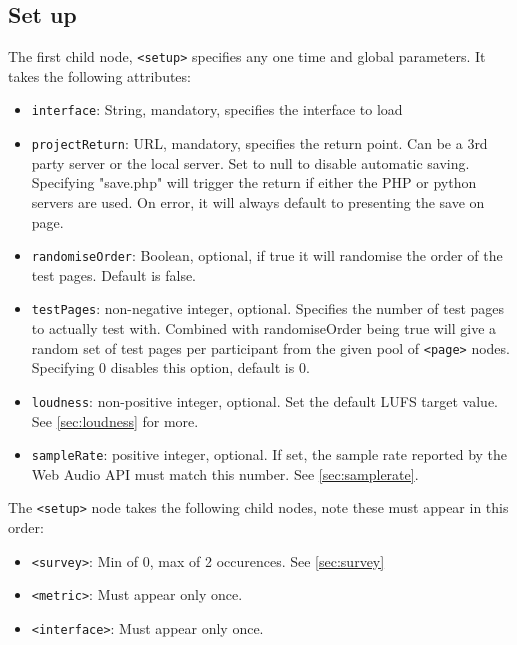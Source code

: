 \documentclass[11pt, oneside]{article}   	%
\begin{document}
    \subsection{Set up}
        The first child node, \texttt{<setup>} specifies any one time and global parameters. It takes the following attributes:
        \begin{itemize}
            \item \texttt{interface}: String, mandatory, specifies the interface to load
            \item \texttt{projectReturn}: URL, mandatory, specifies the return point. Can be a 3rd party server or the local server. Set to null to disable automatic saving. Specifying "save.php" will trigger the return if either the PHP or python servers are used. On error, it will always default to presenting the save on page.
            \item \texttt{randomiseOrder}: Boolean, optional, if true it will randomise the order of the test pages. Default is false.
            \item \texttt{testPages}: non-negative integer, optional. Specifies the number of test pages to actually test with. Combined with randomiseOrder being true will give a random set of test pages per participant from the given pool of \texttt{<page>} nodes. Specifying 0 disables this option, default is 0.
            \item \texttt{loudness}: non-positive integer, optional. Set the default LUFS target value. See \ref{sec:loudness} for more.
            \item \texttt{sampleRate}: positive integer, optional. If set, the sample rate reported by the Web Audio API must match this number. See \ref{sec:samplerate}.
        \end{itemize}
        
        The \texttt{<setup>} node takes the following child nodes, note these must appear in this order:
        \begin{itemize}
            \item \texttt{<survey>}: Min of 0, max of 2 occurences. See \ref{sec:survey}
            \item \texttt{<metric>}: Must appear only once.
            \item \texttt{<interface>}: Must appear only once.
        \end{itemize}
\end{document}
